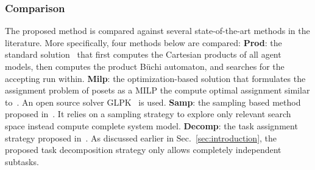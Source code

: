 \subsubsection{Comparison}\label{subsubsec:compare}
The proposed method is compared against several
state-of-the-art methods in the literature.
More specifically, four methods below are compared:
\textbf{Prod}: the standard solution~\cite{baier2008principles}
that first computes
the Cartesian products of all agent models,
then computes the product B\"uchi automaton,
and searches for the accepting run within. 
\textbf{Milp}: the optimization-based solution that
formulates the assignment problem of posets as a MILP
the compute optimal assignment similar
to~\cite{luo2021temporal, jones2019scratchs}.
An open source solver GLPK~\cite{makhorin2008glpk} is used.
\textbf{Samp}: the sampling based method proposed
in~\cite{kantaros2020stylus}. It relies on a sampling strategy
to explore only relevant search space instead compute complete system model. 
\textbf{Decomp}: the task assignment strategy proposed
in~\cite{schillinger2018simultaneous}.
As discussed earlier in Sec.~\ref{sec:introduction},
the proposed task decomposition strategy only allows completely
independent subtasks. 
